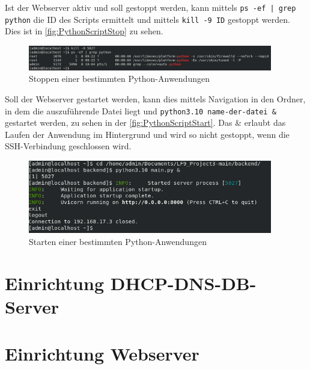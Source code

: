 \documentclass[a4paper,
    11pt,
    headings=small,
    ngerman,
    listof=totoc,
    numbers=noenddot]{scrreprt}[2021/11/13]
\begin{document}
Ist der Webserver aktiv und soll gestoppt werden, kann mittels \texttt{ps -ef | grep python} die ID des Scripts ermittelt und mittels \texttt{kill -9 ID} gestoppt werden. Dies ist in \vref{fig:PythonScriptStop} zu sehen.

\begin{figure}[htbp]
  \centering
  \includegraphics[width=0.95\textwidth]{data/py-script-admin-stop.png}
  \caption{Stoppen einer bestimmten Python-Anwendungen}
  \label{fig:PythonScriptStop}
\end{figure}

Soll der Webserver gestartet werden, kann dies mittels Navigation in den Ordner, in dem die auszuführende Datei liegt und \texttt{python3.10 name-der-datei \&} gestartet werden, zu sehen in der \vref{fig:PythonScriptStart}. Das \& erlaubt das Laufen der Anwendung im Hintergrund und wird so nicht gestoppt, wenn die SSH-Verbindung geschlossen wird.

\begin{figure}[htbp]
  \centering
  \includegraphics[width=0.95\textwidth]{data/py-script-admin-start.png}
  \caption{Starten einer bestimmten Python-Anwendungen}
  \label{fig:PythonScriptStart}
\end{figure}


\section{Einrichtung DHCP-DNS-DB-Server}


\section{Einrichtung Webserver}


\newpage

\listoffigures
\listoftables
\lstlistoflistings

\newpage
\end{document}
